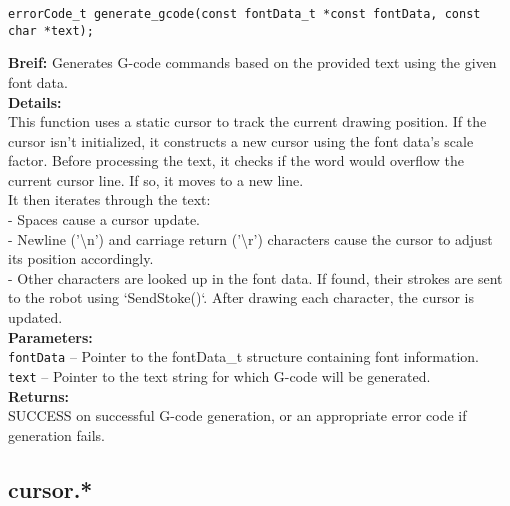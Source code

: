 \begin{verbatim}
errorCode_t generate_gcode(const fontData_t *const fontData, const char *text);
\end{verbatim}
\textbf{Breif:} Generates G-code commands based on the provided text using the given font data. \\
\textbf{Details:} \\
\hspace*{1cm}This function uses a static cursor to track the current drawing position. If the cursor isn't initialized, it constructs a new cursor using the font data's scale factor. Before processing the text, it checks if the word would overflow the current cursor line. If so, it moves to a new line. \\
\hspace*{1cm}It then iterates through the text: \\
\hspace*{1cm}- Spaces cause a cursor update. \\
\hspace*{1cm}- Newline ('\textbackslash n') and carriage return ('\textbackslash r') characters cause the cursor to adjust its position accordingly. \\
\hspace*{1cm}- Other characters are looked up in the font data. If found, their strokes are sent to the robot using `SendStoke()`. After drawing each character, the cursor is updated. \\
\textbf{Parameters:} \\
\hspace*{1cm}\texttt{fontData} -- Pointer to the fontData\_t structure containing font information. \\
\hspace*{1cm}\texttt{text} -- Pointer to the text string for which G-code will be generated. \\
\textbf{Returns:} \\
\hspace*{1cm}SUCCESS on successful G-code generation, or an appropriate error code if generation fails. \\[1em]


\subsection{cursor.*}


